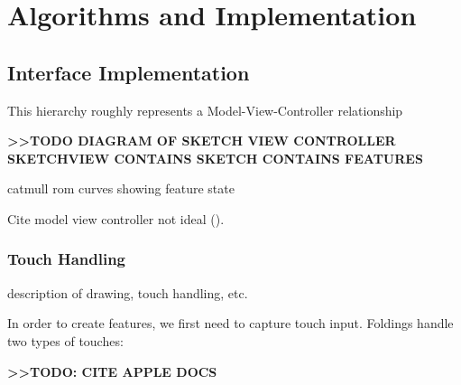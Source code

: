 \chapter{Algorithms and Implementation}

\section{Interface Implementation}\label{interface-implementation}

This hierarchy roughly represents a Model-View-Controller relationship

\textbf{\textgreater{}\textgreater{}TODO DIAGRAM OF SKETCH VIEW
CONTROLLER SKETCHVIEW CONTAINS SKETCH CONTAINS FEATURES}

catmull rom curves showing feature state

Cite model view controller not ideal (\citet{veit2003model}).

\subsection{Touch Handling}\label{touch-handling}

description of drawing, touch handling, etc.

In order to create features, we first need to capture touch input.
Foldings handle two types of touches:

\textbf{\textgreater{}\textgreater{}TODO: CITE APPLE DOCS}
